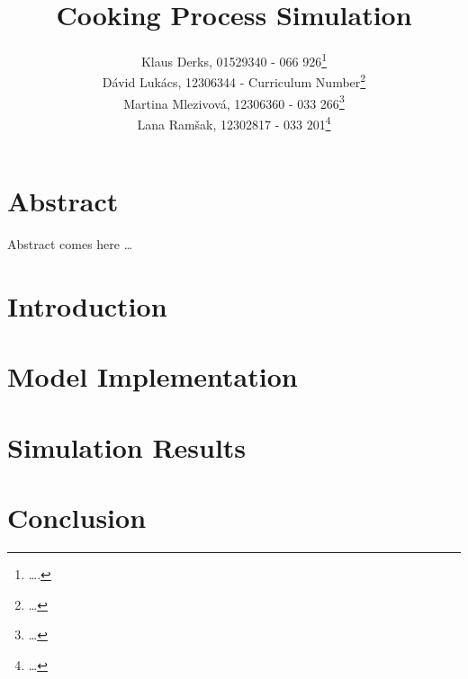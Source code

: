 \documentclass[a4paper,11pt]{scrartcl}
\begin{document}
\subject{Modeling and Simulation}
\title{Cooking Process Simulation}

\publishers{Supervisor: Martin Bicher}
\author{Klaus Derks, 01529340 - 066 926\footnote{\dots.}\\                 %
Dávid Lukács, 12306344 - Curriculum Number\footnote{\dots}\\               %
Martina Mlezivová, 12306360 - 033 266\footnote{\dots}\\ %
Lana Ramšak, 12302817 - 033 201\footnote{\dots}}        %

\maketitle

\section*{Abstract}

Abstract comes here \dots

\newpage

\tableofcontents

\newpage

\section{Introduction}



\newpage

\section{Model Implementation}


\newpage
\section{Simulation Results}


\newpage
\section{Conclusion}


\newpage



\end{document}
